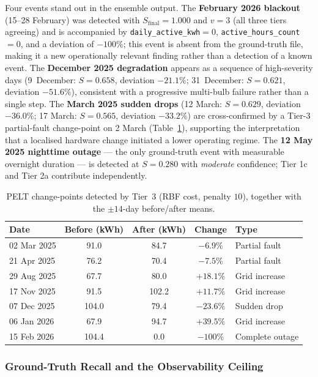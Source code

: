 \documentclass{article}
\begin{document}
Four events stand out in the ensemble output. The \textbf{February 2026 blackout} (15--28 February) was detected with $S_{\text{final}}=1.000$ and $v=3$ (all three tiers agreeing) and is accompanied by \texttt{daily\_active\_kwh}$=0$, \texttt{active\_hours\_count}$=0$, and a deviation of $-100\%$; this event is absent from the ground-truth file, making it a new operationally relevant finding rather than a detection of a known event. The \textbf{December 2025 degradation} appears as a sequence of high-severity days (9~December: $S=0.658$, deviation $-21.1\%$; 31~December: $S=0.621$, deviation $-51.6\%$), consistent with a progressive multi-bulb failure rather than a single step. The \textbf{March 2025 sudden drops} (12 March: $S=0.629$, deviation $-36.0\%$; 17 March: $S=0.565$, deviation $-33.2\%$) are cross-confirmed by a Tier-3 partial-fault change-point on 2 March (Table~\ref{tab:pelt_cps_main}), supporting the interpretation that a localised hardware change initiated a lower operating regime. The \textbf{12 May 2025 nighttime outage} --- the only ground-truth event with measurable overnight duration --- is detected at $S=0.280$ with \textit{moderate} confidence; Tier 1c and Tier 2a contribute independently.

\begin{table}[H]
\centering
\small
\caption{PELT change-points detected by Tier~3 (RBF cost, penalty $10$), together with the $\pm14$-day before/after means.}
\label{tab:pelt_cps_main}
\begin{tabular}{lcccl}
\toprule
\textbf{Date} & \textbf{Before (kWh)} & \textbf{After (kWh)} & \textbf{Change} & \textbf{Type} \\
\midrule
02 Mar 2025 & 91.0  & 84.7  & $-6.9\%$   & Partial fault \\
21 Apr 2025 & 76.2  & 70.4  & $-7.5\%$   & Partial fault \\
29 Aug 2025 & 67.7  & 80.0  & $+18.1\%$  & Grid increase \\
17 Nov 2025 & 91.5  & 102.2 & $+11.7\%$  & Grid increase \\
07 Dec 2025 & 104.0 & 79.4  & $-23.6\%$  & Sudden drop \\
06 Jan 2026 & 67.9  & 94.7  & $+39.5\%$  & Grid increase \\
15 Feb 2026 & 104.4 & 0.0   & $-100\%$   & Complete outage \\
\bottomrule
\end{tabular}
\end{table}

\subsubsection{Ground-Truth Recall and the Observability Ceiling}
\end{document}
